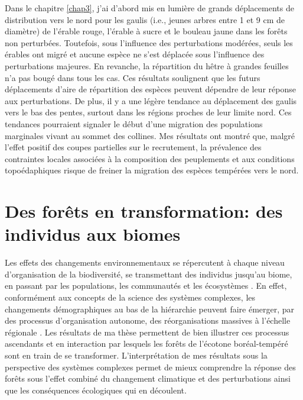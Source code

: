 Dans le chapitre \ref{chap3}, j'ai d'abord mis en lumière de grands
déplacements de distribution vers le nord pour les gaulis (i.e., jeunes
arbres entre 1 et 9 cm de diamètre) de l'érable rouge, l'érable à sucre
et le bouleau jaune dans les forêts non perturbées. Toutefois, sous
l'influence des perturbations modérées, seuls les érables ont migré et
aucune espèce ne s'est déplacée sous l'influence des perturbations
majeures. En revanche, la répartition du hêtre à grandes feuilles n'a
pas bougé dans tous les cas. Ces résultats soulignent que les futurs
déplacements d'aire de répartition des espèces peuvent dépendre de leur
réponse aux perturbations. De plus, il y a une légère tendance au
déplacement des gaulis vers le bas des pentes, surtout dans les régions
proches de leur limite nord. Ces tendances pourraient signaler le début
d'une migration des populations marginales vivant au sommet des
collines. Mes résultats ont montré que, malgré l'effet positif des
coupes partielles sur le recrutement, la prévalence des contraintes
locales associées à la composition des peuplements et aux conditions
topoédaphiques risque de freiner la migration des espèces tempérées vers
le nord.

\hypertarget{des-foruxeats-en-transformation-des-individus-aux-biomes}{%
\section{Des forêts en transformation: des individus aux
biomes}\label{des-foruxeats-en-transformation-des-individus-aux-biomes}}

Les effets des changements environnementaux se répercutent à chaque
niveau d'organisation de la biodiversité, se transmettant des individus
jusqu'au biome, en passant par les populations, les communautés et les
écosystèmes \citep{bellard_impacts_2012, parmesan_globally_2003}. En
effet, conformément aux concepts de la science des systèmes complexes,
les changements démographiques au bas de la hiérarchie peuvent faire
émerger, par des processus d'organisation autonome, des réorganisations
massives à l'échelle régionale \citep[Fig.
\ref{fig4.2};][]{filotas_viewing_2014, messier_managing_2013}. Les
résultats de ma thèse permettent de bien illustrer ces processus
ascendants et en interaction par lesquels les forêts de l'écotone
boréal-tempéré sont en train de se transformer. L'interprétation de mes
résultats sous la perspective des systèmes complexes permet de mieux
comprendre la réponse des forêts sous l'effet combiné du changement
climatique et des perturbations ainsi que les conséquences écologiques
qui en découlent.

